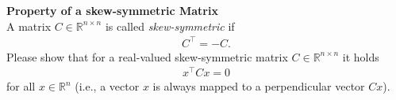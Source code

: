 \textbf{Property of a skew-symmetric Matrix}\\
A matrix $C \in \mathbb{R}^{n \times n}$ is called \textit{skew-symmetric} if
\begin{align*}
C^\top = -C.
\end{align*}
Please show that for a real-valued skew-symmetric matrix $C \in \mathbb{R}^{n\times n}$ it holds
\begin{align*}
x^\top C x = 0
\end{align*}
for all $x \in \mathbb{R}^n$ (i.e., a vector $x$ is always mapped to a perpendicular vector $Cx$).